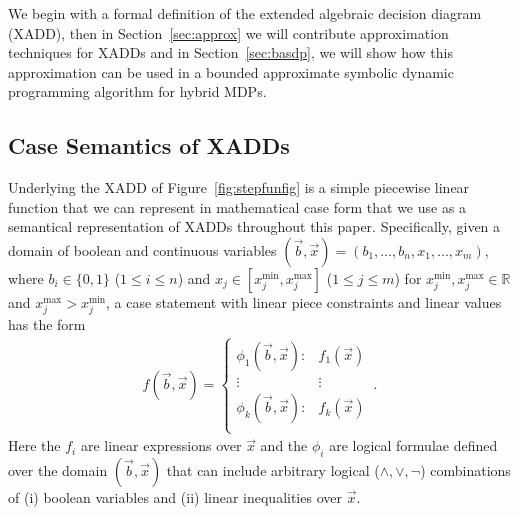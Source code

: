 \label{sec:xadd}

We begin with a formal definition of the extended algebraic decision
diagram (XADD), then in Section~\ref{sec:approx} we will contribute
approximation techniques for XADDs and in Section~\ref{sec:basdp}, we
will show how this approximation can be used in a bounded
approximate symbolic dynamic programming algorithm for hybrid MDPs.

\subsection{Case Semantics of XADDs}



Underlying the XADD of Figure~\ref{fig:stepfunfig} is a simple
piecewise linear function that we can represent in mathematical case
form that we use as a semantical representation of XADDs throughout
this paper.  Specifically, given a domain of boolean and continuous
variables $(\vec{b},\vec{x}) = ( b_1,\ldots,b_n,x_{1},\ldots,x_m )$,
where $b_i \in \{ 0,1 \}$ ($1 \leq i \leq n$) and $x_j \in
[x_j^{\min},x_j^{\max}]$ ($1 \leq j \leq m$) for
$x_j^{\min},x_j^{\max} \in \mathbb{R}$ and $x_j^{\max} > x_j^{\min}$, a case
statement with linear piece constraints and linear values has the form
{\footnotesize 
\begin{align}
f(\vec{b},\vec{x}) = 
\begin{cases}
  \phi_1(\vec{b},\vec{x}): & f_1(\vec{x}) \\ 
 \vdots&\vdots\\ 
  \phi_k(\vec{b},\vec{x}): & f_k(\vec{x}) \\ 
\end{cases} \, . \label{eq:case}
\end{align}
} 
Here the $f_i$ are linear expressions over $\vec{x}$ and the $\phi_i$
are logical formulae defined over the domain $(\vec{b},\vec{x})$ that
can include arbitrary logical ($\land,\lor,\neg$) combinations of (i)
boolean variables and (ii) linear inequalities over $\vec{x}$.

